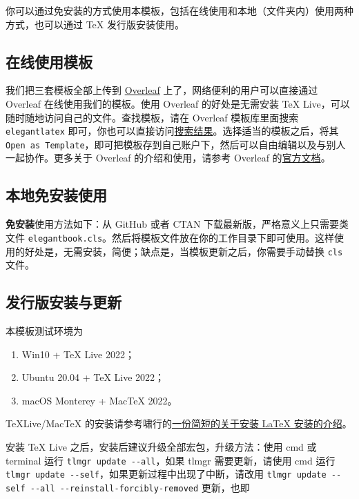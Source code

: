 \documentclass[lang=cn,10pt]{elegantbook}
\begin{document}
你可以通过免安装的方式使用本模板，包括在线使用和本地（文件夹内）使用两种方式，也可以通过 \TeX{} 发行版安装使用。

\subsection{在线使用模板}

我们把三套模板全部上传到 \href{https://www.overleaf.com/}{Overleaf} 上了，网络便利的用户可以直接通过 Overleaf 在线使用我们的模板。使用 Overleaf 的好处是无需安装 \TeX{} Live，可以随时随地访问自己的文件。查找模板，请在 Overleaf 模板库里面搜索 \lstinline{elegantlatex} 即可，你也可以直接访问\href{https://www.overleaf.com/latex/templates?addsearch=elegantlatex}{搜索结果}。选择适当的模板之后，将其 \lstinline{Open as Template}，即可把模板存到自己账户下，然后可以自由编辑以及与别人一起协作。更多关于 Overleaf 的介绍和使用，请参考 Overleaf 的\href{https://www.overleaf.com/learn}{官方文档}。

\subsection{本地免安装使用}

\textbf{免安装}使用方法如下：从 GitHub 或者 CTAN 下载最新版，严格意义上只需要类文件 \lstinline{elegantbook.cls}。然后将模板文件放在你的工作目录下即可使用。这样使用的好处是，无需安装，简便；缺点是，当模板更新之后，你需要手动替换 \lstinline{cls} 文件。

\subsection{发行版安装与更新}

本模板测试环境为 
\begin{enumerate}
  \item Win10 + \TeX{} Live 2022；
  \item Ubuntu 20.04 + \TeX{} Live 2022；
  \item macOS Monterey + Mac\TeX{} 2022。
\end{enumerate}

\TeX Live/Mac\TeX{} 的安装请参考啸行的\href{https://github.com/OsbertWang/install-latex-guide-zh-cn/releases/}{一份简短的关于安装 \LaTeX{} 安装的介绍}。

安装 \TeX{} Live 之后，安装后建议升级全部宏包，升级方法：使用 cmd 或 terminal 运行 \lstinline{tlmgr update --all}，如果 tlmgr 需要更新，请使用 cmd 运行 \lstinline{tlmgr update --self}，如果更新过程中出现了中断，请改用 \lstinline{tlmgr update --self --all --reinstall-forcibly-removed} 更新，也即
\end{document}
